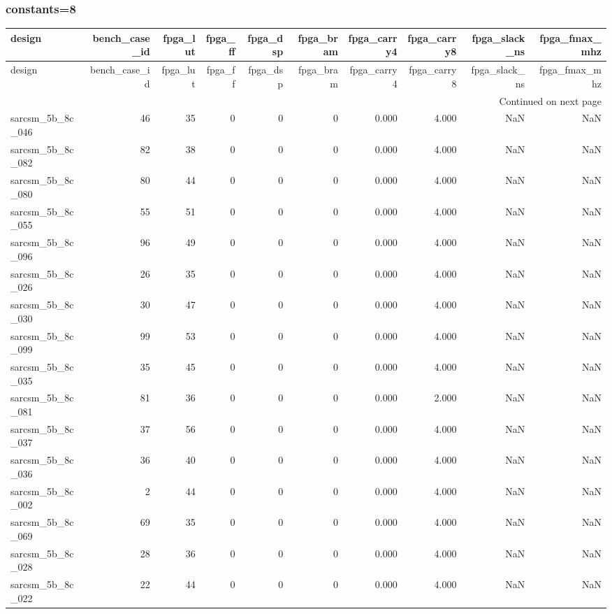 \documentclass{article}
\begin{document}
\subsubsection*{constants=8}
\begin{longtable}{lrrrrrrrrr}
\toprule
design & bench\_case\_id & fpga\_lut & fpga\_ff & fpga\_dsp & fpga\_bram & fpga\_carry4 & fpga\_carry8 & fpga\_slack\_ns & fpga\_fmax\_mhz \\
\midrule
\endfirsthead
\toprule
design & bench\_case\_id & fpga\_lut & fpga\_ff & fpga\_dsp & fpga\_bram & fpga\_carry4 & fpga\_carry8 & fpga\_slack\_ns & fpga\_fmax\_mhz \\
\midrule
\endhead
\midrule
\multicolumn{10}{r}{Continued on next page} \\
\midrule
\endfoot
\bottomrule
\endlastfoot
sarcsm\_5b\_8c\_046 & 46 & 35 & 0 & 0 & 0 & 0.000 & 4.000 & NaN & NaN \\
sarcsm\_5b\_8c\_082 & 82 & 38 & 0 & 0 & 0 & 0.000 & 4.000 & NaN & NaN \\
sarcsm\_5b\_8c\_080 & 80 & 44 & 0 & 0 & 0 & 0.000 & 4.000 & NaN & NaN \\
sarcsm\_5b\_8c\_055 & 55 & 51 & 0 & 0 & 0 & 0.000 & 4.000 & NaN & NaN \\
sarcsm\_5b\_8c\_096 & 96 & 49 & 0 & 0 & 0 & 0.000 & 4.000 & NaN & NaN \\
sarcsm\_5b\_8c\_026 & 26 & 35 & 0 & 0 & 0 & 0.000 & 4.000 & NaN & NaN \\
sarcsm\_5b\_8c\_030 & 30 & 47 & 0 & 0 & 0 & 0.000 & 4.000 & NaN & NaN \\
sarcsm\_5b\_8c\_099 & 99 & 53 & 0 & 0 & 0 & 0.000 & 4.000 & NaN & NaN \\
sarcsm\_5b\_8c\_035 & 35 & 45 & 0 & 0 & 0 & 0.000 & 4.000 & NaN & NaN \\
sarcsm\_5b\_8c\_081 & 81 & 36 & 0 & 0 & 0 & 0.000 & 2.000 & NaN & NaN \\
sarcsm\_5b\_8c\_037 & 37 & 56 & 0 & 0 & 0 & 0.000 & 4.000 & NaN & NaN \\
sarcsm\_5b\_8c\_036 & 36 & 40 & 0 & 0 & 0 & 0.000 & 4.000 & NaN & NaN \\
sarcsm\_5b\_8c\_002 & 2 & 44 & 0 & 0 & 0 & 0.000 & 4.000 & NaN & NaN \\
sarcsm\_5b\_8c\_069 & 69 & 35 & 0 & 0 & 0 & 0.000 & 4.000 & NaN & NaN \\
sarcsm\_5b\_8c\_028 & 28 & 36 & 0 & 0 & 0 & 0.000 & 4.000 & NaN & NaN \\
sarcsm\_5b\_8c\_022 & 22 & 44 & 0 & 0 & 0 & 0.000 & 4.000 & NaN & NaN \\

\end{longtable}
\end{document}
